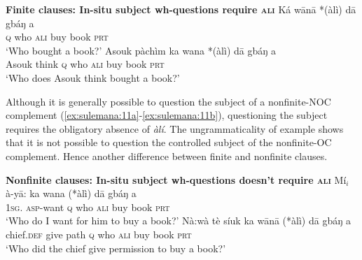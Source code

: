 \documentclass[output=paper,colorlinks,citecolor=brown]{langscibook}
\begin{document}
\ea%
    \label{ex:sulemana:10} 
    {\bf{Finite clauses: In-situ subject wh-questions require \textsc{ali}}}
    \ea%
    \label{ex:sulemana:10a}
    \gll    Ká wānā *(àlì) dā gbáŋ a\\
            \textsc{q} who \textsc{ali} buy book \textsc{prt} \\
    \glt    `Who bought a book?' 
    \ex%
    \gll    Asouk pàchìm ka wana  *(àlì) dā gbáŋ a\\
            Asouk think \textsc{q} who \textsc{ali}  buy book \textsc{prt} \\
    \glt    `Who does Asouk think bought  a book?' 
    \z
\z

Although it is generally possible to question the subject of a nonfinite-NOC complement (\ref{ex:sulemana:11a}-\ref{ex:sulemana:11b}), questioning the subject requires the obligatory absence of {\it{àlí}}. 
The ungrammaticality of example  shows that it is not possible to question the controlled subject of the nonfinite-OC complement. Hence another difference between finite and nonfinite clauses. %

\ea%
    \label{ex:sulemana:11} 
    {\bf{Nonfinite clauses: In-situ subject wh-questions doesn't require \textsc{ali}}}
    \ea%
    \label{ex:sulemana:11a}
    \gll    Mí$_i$ à-yā: ka wana (*àlì) dā gbáŋ a \\
            \textsc{1sg}. \textsc{asp}-want \textsc{q} who  \textsc{ali}  buy book \textsc{prt}  \\
    \glt    `Who do I want for him to buy a book?' 
    \ex%
    \label{ex:sulemana:11b}
    \gll    Nà:wà tè síuk  ka wānā (*àlì) dā gbáŋ a \\
            chief.\textsc{def} give path \textsc{q} who  \textsc{ali} buy book \textsc{prt} \\
    \glt    `Who did the chief give permission to buy a book?' 
    \z
\z
\end{document}
